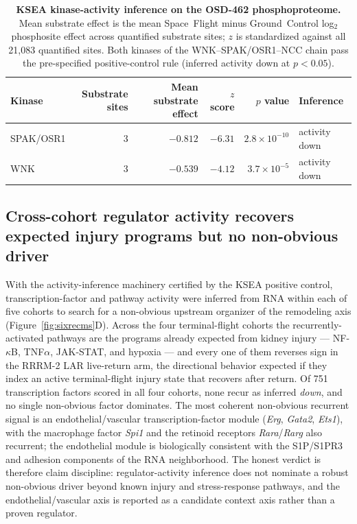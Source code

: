 \documentclass[11pt]{article}
\newcommand{\gene}[1]{\textit{#1}}
\newcommand{\LAR}{LAR\xspace}
\begin{document}
\begin{table}[H]
\centering\small
\begin{tabular}{lrrrrl}
\toprule
Kinase & Substrate sites & Mean substrate effect & $z$ score & $p$ value & Inference \\
\midrule
SPAK/OSR1 & 3 & $-0.812$ & $-6.31$ & $2.8\times10^{-10}$ & activity down \\
WNK & 3 & $-0.539$ & $-4.12$ & $3.7\times10^{-5}$ & activity down \\
\bottomrule
\end{tabular}
\caption{\textbf{KSEA kinase-activity inference on the OSD-462 phosphoproteome.} Mean substrate effect is the mean Space~Flight minus Ground~Control log$_2$ phosphosite effect across quantified substrate sites; $z$ is standardized against all 21{,}083 quantified sites. Both kinases of the WNK--SPAK/OSR1--NCC chain pass the pre-specified positive-control rule (inferred activity down at $p<0.05$).}
\label{tab:ksea}
\end{table}

\subsection{Cross-cohort regulator activity recovers expected injury programs but no non-obvious driver}

With the activity-inference machinery certified by the KSEA positive control, transcription-factor and pathway activity were inferred from RNA within each of five cohorts to search for a non-obvious upstream organizer of the remodeling axis (Figure~\ref{fig:sixrecms}D). Across the four terminal-flight cohorts the recurrently-activated pathways are the programs already expected from kidney injury --- NF-$\kappa$B, TNF$\alpha$, JAK-STAT, and hypoxia --- and every one of them reverses sign in the RRRM-2 \LAR{} live-return arm, the directional behavior expected if they index an active terminal-flight injury state that recovers after return. Of 751 transcription factors scored in all four cohorts, none recur as inferred \emph{down}, and no single non-obvious factor dominates. The most coherent non-obvious recurrent signal is an endothelial/vascular transcription-factor module (\gene{Erg}, \gene{Gata2}, \gene{Ets1}), with the macrophage factor \gene{Spi1} and the retinoid receptors \gene{Rara}/\gene{Rarg} also recurrent; the endothelial module is biologically consistent with the S1P/S1PR3 and adhesion components of the RNA neighborhood. The honest verdict is therefore claim discipline: regulator-activity inference does not nominate a robust non-obvious driver beyond known injury and stress-response pathways, and the endothelial/vascular axis is reported as a candidate context axis rather than a proven regulator.
\end{document}
